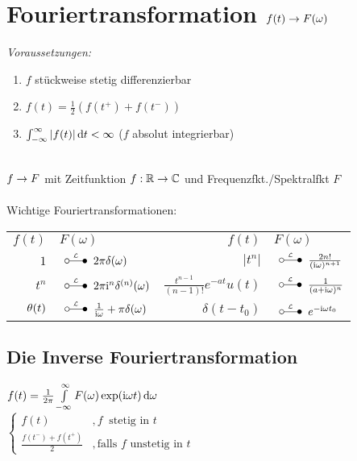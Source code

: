 \documentclass[german,color,6pt]{latex4ei/latex4ei_fs}
\begin{document}
\section{Fouriertransformation $f(t) \rightarrow F(\omega)$}
\begin{sectionbox}
	\emph{Voraussetzungen:}
	\begin{enumerate}
		\item $f$ stückweise stetig differenzierbar
		\item $f(t) = \frac{1}{2}\left(f(t^+) + f(t^-)\right)$
		\item $\int_{-\infty}^{\infty}\abs{f(t)} \diff t < \infty$ ($f$ absolut integrierbar)
	\end{enumerate}
	\quad \\
	$f \rightarrow F$ mit Zeitfunktion $f:\operatorname{\mathbb R} \rightarrow \mathbb C$ und Frequenzfkt./Spektralfkt $F$\\
	 \\
	
	Wichtige Fouriertransformationen:\\
	\begin{tabular}{rl|rl}
		$f(t)$ & \qquad $F(\omega)$ & $f(t)$ & \qquad $F(\omega)$\\		%
		$1$ & \!\!\!\!\!\!\!\!\!\! $\LT 2\pi \delta(\omega)$ & $|t^n|$ & \!\!\!\!\!\!\!\!\!\! $\LT \frac{2n!}{(\i \omega)^{n+1}}$\\
		$t^n$ & \!\!\!\!\!\!\!\!\!\! $\LT 2\pi \i^n \delta^{(n)}(\omega)$ & $\frac{t^{n-1}}{(n-1)!} e^{-at} u(t)$ & \!\!\!\!\!\!\!\!\!\! $\LT \frac{1}{(a+\i \omega)^n}$\\
		$\operatorname{\theta}(t)$ & \!\!\!\!\!\!\!\!\!\! $\LT \frac{1}{\i \omega} + \pi \delta(\omega)$ & $\delta(t-t_0)$ & \!\!\!\!\!\!\!\!\!\! $\LT e^{-\i \omega t_0}$
	\end{tabular}
	\subsection{Die Inverse Fouriertransformation}
	$f(t) = \frac{1}{2\pi} \int\limits_{-\infty}^\infty F(\omega) \exp(\i \omega t) \diff \omega$\\
	$\begin{cases} f(t) & ,f\ \text{ stetig in }t \\ \frac{f(t^-) + f(t^+)}{2} & ,\text{falls } f\text{ unstetig in }t \end{cases}$
\end{sectionbox}
\end{document}
